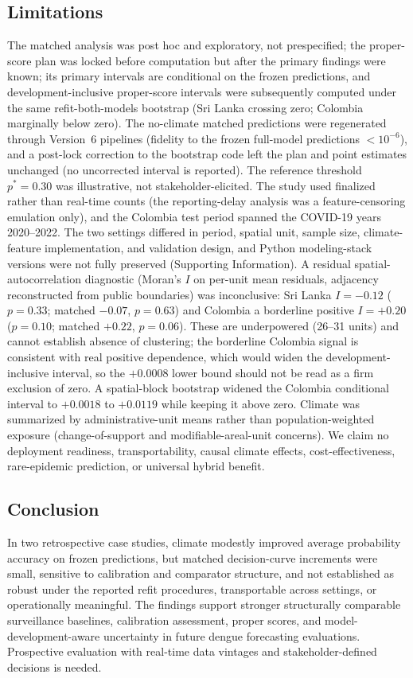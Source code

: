 \documentclass[11pt,a4paper]{article}
\begin{document}
\subsection*{Limitations}
The matched analysis was post hoc and exploratory, not prespecified; the proper-score plan was locked before computation but after the primary findings were known; its primary intervals are conditional on the frozen predictions, and development-inclusive proper-score intervals were subsequently computed under the same refit-both-models bootstrap (Sri Lanka crossing zero; Colombia marginally below zero). The no-climate matched predictions were regenerated through Version~6 pipelines (fidelity to the frozen full-model predictions $<10^{-6}$), and a post-lock correction to the bootstrap code left the plan and point estimates unchanged (no uncorrected interval is reported). The reference threshold $p^*=0.30$ was illustrative, not stakeholder-elicited. The study used finalized rather than real-time counts (the reporting-delay analysis was a feature-censoring emulation only), and the Colombia test period spanned the COVID-19 years 2020--2022. The two settings differed in period, spatial unit, sample size, climate-feature implementation, and validation design, and Python modeling-stack versions were not fully preserved (Supporting Information). A residual spatial-autocorrelation diagnostic (Moran's $I$ on per-unit mean residuals, adjacency reconstructed from public boundaries) was inconclusive: Sri Lanka $I=-0.12$ ($p=0.33$; matched $-0.07$, $p=0.63$) and Colombia a borderline positive $I=+0.20$ ($p=0.10$; matched $+0.22$, $p=0.06$). These are underpowered (26--31 units) and cannot establish absence of clustering; the borderline Colombia signal is consistent with real positive dependence, which would widen the development-inclusive interval, so the $+0.0008$ lower bound should not be read as a firm exclusion of zero. A spatial-block bootstrap widened the Colombia conditional interval to $+0.0018$ to $+0.0119$ while keeping it above zero. Climate was summarized by administrative-unit means rather than population-weighted exposure (change-of-support and modifiable-areal-unit concerns). We claim no deployment readiness, transportability, causal climate effects, cost-effectiveness, rare-epidemic prediction, or universal hybrid benefit.


\subsection*{Conclusion}
In two retrospective case studies, climate modestly improved average probability accuracy on frozen predictions, but matched decision-curve increments were small, sensitive to calibration and comparator structure, and not established as robust under the reported refit procedures, transportable across settings, or operationally meaningful. The findings support stronger structurally comparable surveillance baselines, calibration assessment, proper scores, and model-development-aware uncertainty in future dengue forecasting evaluations. Prospective evaluation with real-time data vintages and stakeholder-defined decisions is needed.
\end{document}
